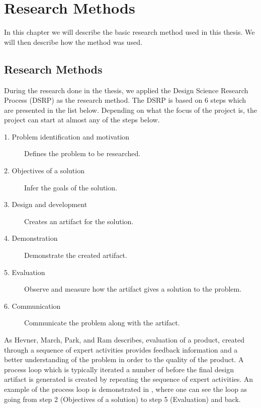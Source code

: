 
\chapter{Research Methods} %
\label{cha:research_questions_and_method}
In this chapter we will describe the basic research method used in this 
thesis. We will then describe how the method was used.
\section{Research Methods} %
\label{sec:research_method}

During the research done in the thesis, we applied the Design Science Research 
Process (DSRP) as the research method. The DSRP is based on 6 steps which are 
presented in the list below. Depending on what the focus of the project is, 
the project can start at almost any of the steps below. \cite{peffers2006design}

\begin{description}
	\item [1. Problem identification and motivation] Defines the problem to be
	researched. 
	\item [2. Objectives of a solution] Infer the goals of the solution.
	\item [3. Design and development] Creates an artifact for the solution.
	\item [4. Demonstration] Demonstrate the created artifact.
	\item [5. Evaluation] Observe and measure how the artifact gives a 
	solution to the problem.
	\item [6. Communication] Communicate the problem along with the artifact.
\end{description}

As Hevner, March, Park, and Ram \cite{von2004design} describes, 
evaluation of a product, created through a sequence of expert activities 
provides feedback information and a better understanding of the problem in 
order to the quality of the product. A process loop which is typically 
iterated a number of before the final design artifact is generated is created 
by repeating the sequence of expert activities. An example of the process loop 
is demonstrated in , where one can see the loop as going 
from step 2 (Objectives of a solution) to step 5 (Evaluation) and back.\\

